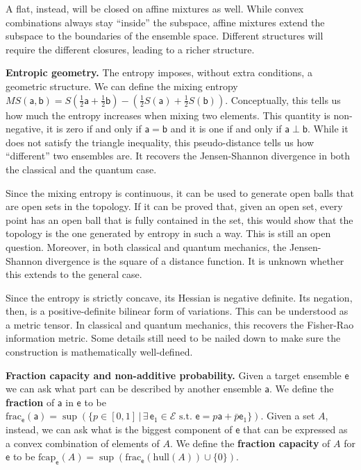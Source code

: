 \documentclass[10pt,twocolumn, nofootinbib]{revtex4-2}
\newcommand\fraction{\mathrm{frac}}
\newcommand\frcap{\mathrm{fcap}}
\newcommand{\ens}[1][e] {\mathsf{#1}} %
\newcommand{\Ens}[1][E] {\mathcal{#1}} %
\newcommand\hull{\mathrm{hull}}
\def\ortho{\perp}
\begin{document}
A flat, instead, will be closed on affine mixtures as well. While convex combinations always stay ``inside'' the subspace, affine mixtures extend the subspace to the boundaries of the ensemble space. Different structures will require the different closures, leading to a richer structure.

\textbf{Entropic geometry.} The entropy imposes, without extra conditions, a geometric structure. We can define the mixing entropy $MS(\ens[a], \ens[b]) = S\left(\frac{1}{2}\ens[a] + \frac{1}{2} \ens[b]\right) - \left(\frac{1}{2} S(\ens[a]) + \frac{1}{2} S(\ens[b])\right).$ Conceptually, this tells us how much the entropy increases when mixing two elements. This quantity is non-negative, it is zero if and only if $\ens[a] = \ens[b]$ and it is one if and only if $\ens[a] \ortho \ens[b]$. While it does not satisfy the triangle inequality, this pseudo-distance tells us how ``different'' two ensembles are. It recovers the Jensen-Shannon divergence in both the classical and the quantum case.

Since the mixing entropy is continuous, it can be used to generate open balls that are open sets in the topology. If it can be proved that, given an open set, every point has an open ball that is fully contained in the set, this would show that the topology is the one generated by entropy in such a way. This is still an open question. Moreover, in both classical and quantum mechanics, the Jensen-Shannon divergence is the square of a distance function. It is unknown whether this extends to the general case.

Since the entropy is strictly concave, its Hessian is negative definite. Its negation, then, is a positive-definite bilinear form of variations. This can be understood as a metric tensor. In classical and quantum mechanics, this recovers the Fisher-Rao information metric. Some details still need to be nailed down to make sure the construction is mathematically well-defined.

\textbf{Fraction capacity and non-additive probability.} Given a target ensemble $\ens$ we can ask what part can be described by another ensemble $\ens[a]$. We define the \textbf{fraction} of $\ens[a]$ in $\ens$ to be $\fraction_{\ens}(\ens[a]) = \sup(\{ p \in [0,1] \, | \, \exists \, \ens_1 \in \Ens \text{ s.t. }  \ens = p \ens[a] + \bar{p} \ens_1 \})$. Given a set $A$, instead, we can ask what is the biggest component of $\ens$ that can be expressed as a convex combination of elements of $A$. We define the \textbf{fraction capacity} of $A$ for $\ens$ to be $\frcap_{\ens}(A) = \sup(\fraction_{\ens}(\hull(A))\cup\{0\})$.
\end{document}
